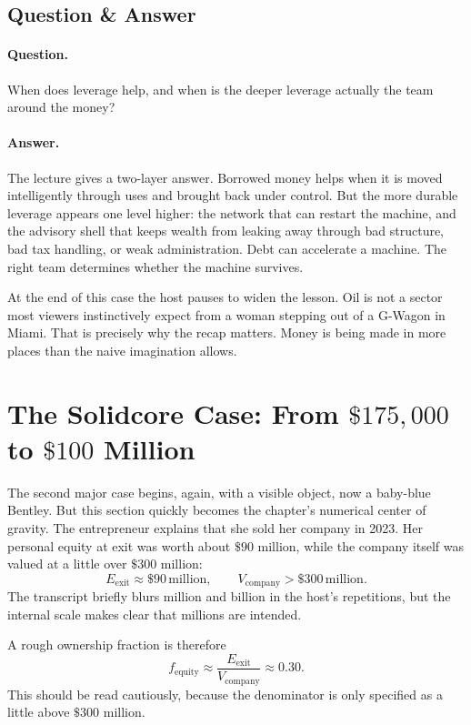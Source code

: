 \subsection{Question \& Answer}

\paragraph{Question.}
When does leverage help, and when is the deeper leverage actually the team around the money?

\paragraph{Answer.}
The lecture gives a two-layer answer. Borrowed money helps when it is moved intelligently through uses and brought back under control. But the more durable leverage appears one level higher: the network that can restart the machine, and the advisory shell that keeps wealth from leaking away through bad structure, bad tax handling, or weak administration. Debt can accelerate a machine. The right team determines whether the machine survives.

At the end of this case the host pauses to widen the lesson. Oil is not a sector most viewers instinctively expect from a woman stepping out of a G-Wagon in Miami. That is precisely why the recap matters. Money is being made in more places than the naive imagination allows.

\section{The Solidcore Case: From \(\$175{,}000\) to \(\$100\) Million}

The second major case begins, again, with a visible object, now a baby-blue Bentley. But this section quickly becomes the chapter's numerical center of gravity. The entrepreneur explains that she sold her company in 2023. Her personal equity at exit was worth about \(\$90\) million, while the company itself was valued at a little over \(\$300\) million:
\begin{equation}
E_{\text{exit}} \approx \$90\,\text{million},
\qquad
V_{\text{company}} > \$300\,\text{million}.
\end{equation}
The transcript briefly blurs million and billion in the host's repetitions, but the internal scale makes clear that millions are intended.

A rough ownership fraction is therefore
\begin{equation}
f_{\text{equity}}
\approx
\frac{E_{\text{exit}}}{V_{\text{company}}}
\approx
0.30.
\end{equation}
This should be read cautiously, because the denominator is only specified as a little above \(\$300\) million.

